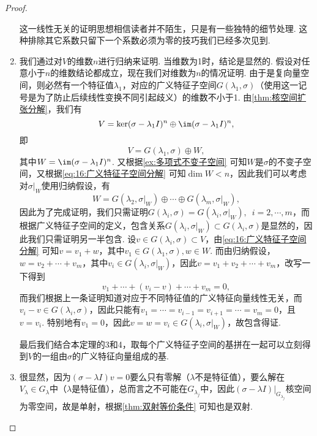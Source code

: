 \begin{proof}
\begin{enumerate}
              这一线性无关的证明思想相信读者并不陌生，只是有一些独特的细节处理. 这种排除其它系数只留下一个系数必须为零的技巧我们已经多次见到.

        \item 我们通过对$V$的维数$n$进行归纳来证明. 当维数为1时，结论是显然的. 假设对任意小于$n$的维数结论都成立，现在我们对维数为$n$的情况证明. 由于是复向量空间，则必然有一个特征值$\lambda_1$，对应的广义特征子空间$G(\lambda_1,\sigma)$（使用这一记号是为了防止后续线性变换不同引起歧义）的维数不小于1. 由\autoref{thm:核空间扩张分解}，我们有
              \[V=\ker(\sigma-\lambda_1 I)^n\oplus\im(\sigma-\lambda_1 I)^n,\]
              即
              \begin{equation} \label{eq:16:广义特征子空间分解}
                  V=G(\lambda_1,\sigma)\oplus W,
              \end{equation}
              其中$W=\im(\sigma-\lambda_1 I)^n$. 又根据\autoref{ex:多项式不变子空间} 可知$W$是$\sigma$的不变子空间，又根据\autoref{eq:16:广义特征子空间分解} 可知$\dim W<n$，因此我们可以考虑对$\sigma\vert_W$使用归纳假设，有
              \[W=G(\lambda_2,\sigma\vert_W)\oplus\cdots\oplus G(\lambda_m,\sigma\vert_W),\]
              因此为了完成证明，我们只需证明$G(\lambda_i,\sigma)=G(\lambda_i,\sigma\vert_W),\enspace i=2,\cdots,m$，而根据广义特征子空间的定义，包含关系$G(\lambda_i,\sigma\vert_W)\subset G(\lambda_i,\sigma)$是显然的，因此我们只需证明另一半包含. 设$v\in G(\lambda_i,\sigma)\subset V$，由\autoref{eq:16:广义特征子空间分解} 可知$v=v_1+w$，其中$v_1\in G(\lambda_1,\sigma),w\in W$. 而由归纳假设，$w=v_2+\cdots+v_m$，其中$v_i\in G(\lambda_i,\sigma\vert_W)$，因此$v=v_1+v_2+\cdots+v_m$，改写一下得到
              \[v_1+\cdots+(v_i-v)+\cdots+v_m=0,\]
              而我们根据上一条证明知道对应于不同特征值的广义特征向量线性无关，而$v_i-v\in G(\lambda_i,\sigma)$，因此只能有$v_1=\cdots=v_{i-1}=v_{i+1}=\cdots=v_m=0$，且$v=v_i$. 特别地有$v_1=0$，因此$v=w=v_i\in G(\lambda_i,\sigma\vert_W)$，故包含得证.

              最后我们结合本定理的3和4，取每个广义特征子空间的基拼在一起可以立刻得到$V$的一组由$\sigma$的广义特征向量组成的基.

        \item 很显然，因为$(\sigma-\lambda I)v=0$要么只有零解（$\lambda$不是特征值），要么解在$V_\lambda\in G_\lambda$中（$\lambda$是特征值），总而言之不可能在$G_{\lambda_j}$中，因此$(\sigma-\lambda I)\vert_{G_{\lambda_j}}$核空间为零空间，故是单射，根据\autoref{thm:双射等价条件} 可知也是双射.
    \end{enumerate}
\end{proof}

